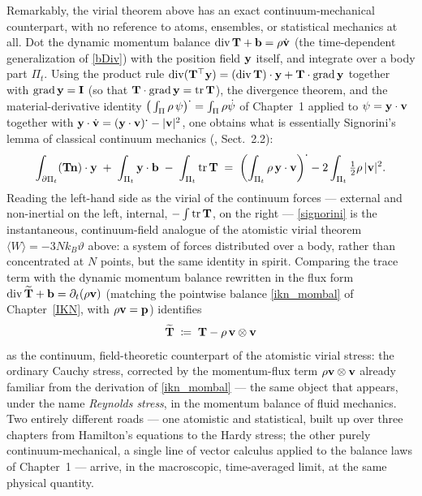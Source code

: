\begin{remark}\label{rem:continuumvirial}
	Remarkably, the virial theorem above has an exact continuum-mechanical counterpart, with no reference to atoms, ensembles, or statistical mechanics at all. Dot the dynamic momentum balance $\operatorname{div}\mathbf{T}+\mathbf{b}=\rho\dot{\mathbf{v}}$ (the time-dependent generalization of \eqref{bDiv}) with the position field $\mathbf{y}$ itself, and integrate over a body part $\Pi_t$. Using the product rule $\operatorname{div}(\mathbf{T}^\top\mathbf{y})=(\operatorname{div}\mathbf{T})\cdot\mathbf{y}+\mathbf{T}\cdot\operatorname{grad}\mathbf{y}$ together with $\operatorname{grad}\mathbf{y}=\mathbf{I}$ (so that $\mathbf{T}\cdot\operatorname{grad}\mathbf{y}=\operatorname{tr}\mathbf{T}$), the divergence theorem, and the material-derivative identity $\big(\int_{\Pi}\rho\,\psi\big)^{\operatorname{{\boldsymbol{\cdot}}}}=\int_{\Pi}\rho\dot\psi$ of Chapter~1 applied to $\psi=\mathbf{y}\cdot\mathbf{v}$ together with $\mathbf{y}\cdot\dot{\mathbf{v}}=(\mathbf{y}\cdot\mathbf{v})^{\operatorname{{\boldsymbol{\cdot}}}}-|\mathbf{v}|^2$, one obtains what is essentially Signorini's lemma of classical continuum mechanics (\cite{PodioGuidugli2019}, Sect.~2.2):
	\begin{equation}\label{signorini}
		\int_{\partial\Pi_t}(\mathbf{T}\mathbf{n})\cdot\mathbf{y} \;+\; \int_{\Pi_t}\mathbf{y}\cdot\mathbf{b} \;-\; \int_{\Pi_t}\operatorname{tr}\mathbf{T} \;=\; \left(\int_{\Pi_t}\rho\,\mathbf{y}\cdot\mathbf{v}\right)^{\operatorname{{\boldsymbol{\cdot}}}} - 2\int_{\Pi_t}\tfrac12\rho\,|\mathbf{v}|^2.
	\end{equation}
	Reading the left-hand side as the virial of the continuum forces --- external and non-inertial on the left, internal, $-\int\operatorname{tr}\mathbf{T}$, on the right --- \eqref{signorini} is the instantaneous, continuum-field analogue of the atomistic virial theorem $\langle W\rangle=-3Nk_B\vartheta$ above: a system of forces distributed over a body, rather than concentrated at $N$ points, but the same identity in spirit. Comparing the trace term with the dynamic momentum balance rewritten in the flux form $\operatorname{div}\widetilde{\mathbf{T}}+\mathbf{b}=\partial_t(\rho\mathbf{v})$ (matching the pointwise balance \eqref{ikn_mombal} of Chapter~\ref{IKN}, with $\rho\mathbf{v}=\mathbf{p}$) identifies
	\begin{equation}\label{contvirialstress}
		\widetilde{\mathbf{T}} \;\coloneqq\; \mathbf{T} - \rho\,\mathbf{v}\otimes\mathbf{v}
	\end{equation}
	as the continuum, field-theoretic counterpart of the atomistic virial stress: the ordinary Cauchy stress, corrected by the momentum-flux term $\rho\mathbf{v}\otimes\mathbf{v}$ already familiar from the derivation of \eqref{ikn_mombal} --- the same object that appears, under the name \textit{Reynolds stress}, in the momentum balance of fluid mechanics. Two entirely different roads --- one atomistic and statistical, built up over three chapters from Hamilton's equations to the Hardy stress; the other purely continuum-mechanical, a single line of vector calculus applied to the balance laws of Chapter~1 --- arrive, in the macroscopic, time-averaged limit, at the same physical quantity.
\end{remark}

